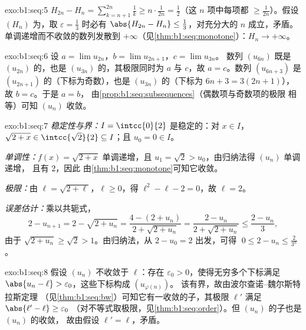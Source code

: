 \begin{solution}{exo:b1:seq:5}
$H_{2n} - H_n = \sum_{k=n+1}^{2n} \frac 1k \geq n \cdot
\frac{1}{2n} = \frac12$（这 $n$ 项中每项都 $\geq
\frac{1}{2n}$）。假设 $(H_n)$ 为，取 $\varepsilon =
\frac13$ 时必有 $\abs{H_{2n} - H_n} \leq \frac13$，对充分大的
$n$ 成立，矛盾。单调递增而不收敛的数列发散到
$+\infty$（见\cref{thm:b1:seq:monotone}）：$H_n \to +\infty$。
\end{solution}

\begin{solution}{exo:b1:seq:6}
设 $a = \lim u_{2n}$，$b = \lim u_{2n+1}$，$c = \lim u_{3n}$。
数列 $(u_{6n})$ 既是 $(u_{2n})$ 的，也是
$(u_{3n})$ 的，其极限同时为 $a$ 与 $c$，故 $a = c$。数列
$(u_{6n+3})$ 是 $(u_{2n+1})$ 的（下标为奇数），也是
$(u_{3n})$ 的（下标为 $6n + 3 = 3(2n+1)$），故 $b = c$。于是 $a = b$，
由\cref{prop:b1:seq:subsequences}（偶数项与奇数项的极限
相等）可知 $(u_n)$ 收敛。
\end{solution}

\begin{solution}{exo:b1:seq:7}
\emph{稳定性与界：}$I = \intcc{0}{2}$ 是稳定的：对 $x \in
I$，$\sqrt{2 + x} \in \intcc{\sqrt 2}{2} \subseteq I$；且 $u_0 = 0
\in I$。

\emph{单调性：}$f(x) = \sqrt{2+x}$ 单调递增，且 $u_1 =
\sqrt 2 > u_0$，由归纳法得 $(u_n)$ 单调递增，
且有 $2$，因此
由\cref{thm:b1:seq:monotone}可知它收敛。

\emph{极限：}由 $\ell = \sqrt{2 + \ell}$，$\ell \geq 0$，得
$\ell^2 - \ell - 2 = 0$，故 $\ell = 2$。

\emph{误差估计：}乘以共轭式，
\[
2 - u_{n+1} = 2 - \sqrt{2 + u_n}
= \frac{4 - (2 + u_n)}{2 + \sqrt{2+u_n}}
= \frac{2 - u_n}{2 + \sqrt{2 + u_n}}
\leq \frac{2 - u_n}{3},
\]
由于 $\sqrt{2 + u_n} \geq \sqrt 2 > 1$。由归纳法，从 $2 - u_0
= 2$ 出发，可得 $\;0 \leq 2 - u_n \leq \frac{2}{3^n}$。
\end{solution}

\begin{solution}{exo:b1:seq:8}
假设 $(u_n)$ 不收敛于 $\ell$：存在 $\varepsilon_0
> 0$，使得无穷多个下标满足 $\abs{u_n - \ell} >
\varepsilon_0$，这些下标构成 $(u_{\varphi(n)})$。
该有界，故由波尔查诺–魏尔斯特拉斯定理
（见\cref{thm:b1:seq:bw}）可知它有一收敛的子，其极限
$\ell'$ 满足 $\abs{\ell' - \ell} \geq \varepsilon_0$
（对不等式取极限，见\cref{thm:b1:seq:order}）。但
$(u_n)$ 的子也是 $(u_n)$ 的收敛，
故由假设 $\ell' = \ell$，矛盾。
\end{solution}

